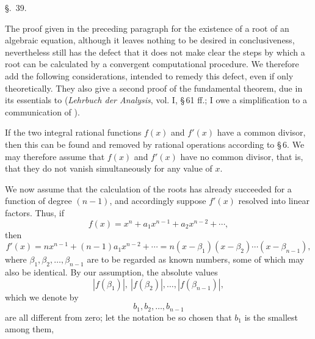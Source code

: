 
\begin{center}
{\large \S.\ 39.}

\vspace{0.5em}
{\large{}}
\end{center}

The proof given in the preceding paragraph for the existence of a root of an algebraic equation, although it leaves nothing to be desired in conclusiveness, nevertheless still has the defect that it does not make clear the steps by which a root can be calculated by a convergent computational procedure. We therefore add the following considerations, intended to remedy this defect, even if only theoretically. They also give a second proof of the fundamental theorem, due in its essentials to  (\emph{Lehrbuch der Analysis}, vol. I, \S\,61 ff.; I owe a simplification to a communication of ).

If the two integral rational functions $f(x)$ and $f'(x)$ have a common divisor, then this can be found and removed by rational operations according to \S\,6. We may therefore assume that $f(x)$ and $f'(x)$ have no common divisor, that is, that they do not vanish simultaneously for any value of $x$.

We now assume that the calculation of the roots has already succeeded for a function of degree $(n-1)$, and accordingly suppose $f'(x)$ resolved into linear factors. Thus, if
\begin{equation}
 f(x)=x^n+a_1x^{n-1}+a_2x^{n-2}+\cdots,
\tag{1}
\end{equation}
then
\begin{equation}
 f'(x)=nx^{n-1}+(n-1)a_1x^{n-2}+\cdots
      =n(x-\beta_1)(x-\beta_2)\cdots(x-\beta_{n-1}),
\tag{2}
\end{equation}
where $\beta_1,\beta_2,\ldots,\beta_{n-1}$ are to be regarded as known numbers, some of which may also be identical. By our assumption, the absolute values
\begin{equation}
 |f(\beta_1)|,\ |f(\beta_2)|,\ldots, |f(\beta_{n-1})|,
\tag{3}
\end{equation}
which we denote by
\begin{equation}
 b_1,b_2,\ldots,b_{n-1}
\tag{4}
\end{equation}
are all different from zero; let the notation be so chosen that $b_1$ is the smallest among them,
